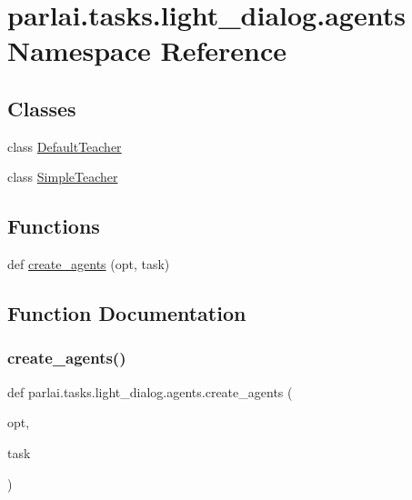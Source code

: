 \hypertarget{namespaceparlai_1_1tasks_1_1light__dialog_1_1agents}{}\section{parlai.\+tasks.\+light\+\_\+dialog.\+agents Namespace Reference}
\label{namespaceparlai_1_1tasks_1_1light__dialog_1_1agents}
\subsection*{Classes}
\begin{DoxyCompactItemize}
\item 
class \hyperlink{classparlai_1_1tasks_1_1light__dialog_1_1agents_1_1DefaultTeacher}{Default\+Teacher}
\item 
class \hyperlink{classparlai_1_1tasks_1_1light__dialog_1_1agents_1_1SimpleTeacher}{Simple\+Teacher}
\end{DoxyCompactItemize}
\subsection*{Functions}
\begin{DoxyCompactItemize}
\item 
def \hyperlink{namespaceparlai_1_1tasks_1_1light__dialog_1_1agents_ad302d417b1eeaa0667e8353437153d7f}{create\+\_\+agents} (opt, task)
\end{DoxyCompactItemize}


\subsection{Function Documentation}
\mbox{\label{namespaceparlai_1_1tasks_1_1light__dialog_1_1agents_ad302d417b1eeaa0667e8353437153d7f}} 
\subsubsection{\texorpdfstring{create\+\_\+agents()}{create\_agents()}}
{\footnotesize\ttfamily def parlai.\+tasks.\+light\+\_\+dialog.\+agents.\+create\+\_\+agents (\begin{DoxyParamCaption}\item[{}]{opt,  }\item[{}]{task }\end{DoxyParamCaption})}


